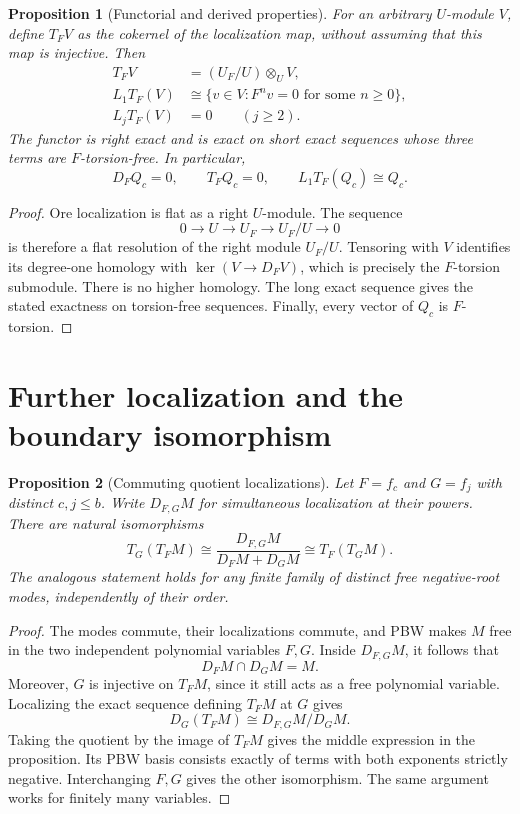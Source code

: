 \documentclass[11pt,a4paper]{article}
\theoremstyle{plainupright}
\newtheorem{proposition}{Proposition}[section]
\begin{document}
\begin{proposition}[Functorial and derived properties]\label{prop:derived}
For an arbitrary \(U\)-module \(V\), define \(T_FV\) as the cokernel of
the localization map, without assuming that this map is injective.
Then
\begin{align*}
T_FV&=(U_F/U)\otimes_U V,\\
L_1T_F(V)&\cong\{v\in V:F^nv=0\text{ for some }n\ge0\},\\
L_jT_F(V)&=0\qquad(j\ge2).
\end{align*}
The functor is right exact and is exact on short exact sequences whose
three terms are \(F\)-torsion-free. In particular,
\[
D_FQ_c=0,\qquad T_FQ_c=0,\qquad L_1T_F(Q_c)\cong Q_c.
\]
\end{proposition}
\begin{proof}
Ore localization is flat as a right \(U\)-module. The sequence
\[
0\longrightarrow U\longrightarrow U_F\longrightarrow U_F/U
\longrightarrow0
\]
is therefore a flat resolution of the right module \(U_F/U\).
Tensoring with \(V\) identifies its degree-one homology with
\(\ker(V\to D_FV)\), which is precisely the \(F\)-torsion submodule.
There is no higher homology. The long exact sequence gives the
stated exactness on torsion-free sequences.
Finally, every vector of \(Q_c\) is \(F\)-torsion.
\end{proof}

\section{Further localization and the boundary isomorphism}

\begin{proposition}[Commuting quotient localizations]\label{prop:commuting}
Let \(F=f_c\) and \(G=f_j\) with distinct \(c,j\le b\).
Write \(D_{F,G}M\) for simultaneous localization at their powers.
There are natural isomorphisms
\[
T_G(T_FM)\cong
\frac{D_{F,G}M}{D_FM+D_GM}
\cong T_F(T_GM).
\]
The analogous statement holds for any finite family of distinct
free negative-root modes, independently of their order.
\end{proposition}
\begin{proof}
The modes commute, their localizations commute, and PBW makes \(M\)
free in the two independent polynomial variables \(F,G\).
Inside \(D_{F,G}M\), it follows that
\[
D_FM\cap D_GM=M.
\]
Moreover, \(G\) is injective on \(T_FM\), since it still acts as a
free polynomial variable. Localizing the exact sequence defining
\(T_FM\) at \(G\) gives
\[
D_G(T_FM)\cong D_{F,G}M/D_GM.
\]
Taking the quotient by the image of \(T_FM\) gives the middle
expression in the proposition. Its PBW basis consists exactly of
terms with both exponents strictly negative. Interchanging \(F,G\)
gives the other isomorphism. The same argument works for finitely
many variables.
\end{proof}
\end{document}
